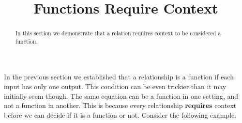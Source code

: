 \documentclass{ximeraXloud}
\title{Functions Require Context}
\begin{document}
\begin{abstract}
    In this section we demonstrate that a relation requires context to be considered a function.
\end{abstract}
\maketitle

    In the previous section we established that a relationship is a function if each input has only one output. This condition can be even trickier than it may initially seem though. The same equation can be a function in one setting, and not a function in another. This is because every relationship \textbf{requires} context before we can decide if it is a function or not. Consider the following example.
    
\end{document}
